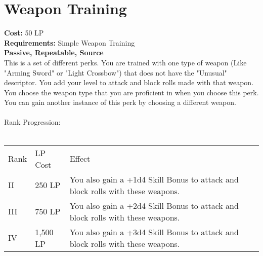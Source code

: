 \section{Weapon Training}\label{perk:weaponTraining}
\textbf{Cost:} 50 LP\\
\textbf{Requirements:} Simple Weapon Training\\
\textbf{Passive, Repeatable, Source}\\
This is a set of different perks.
You are trained with one type of weapon (Like "Arming Sword" or "Light Crossbow") that does not have the "Unusual" descriptor.
You add your level to attack and block rolls made with that weapon.\\
You choose the weapon type that you are proficient in when you choose this perk.
You can gain another instance of this perk by choosing a different weapon.\\
\\
Rank Progression:\\
\\
\begin{longtable}{l | l | p{9cm}}
	Rank & LP Cost & Effect\\
	II & 250 LP & You also gain a +1d4 Skill Bonus to attack and block rolls with these weapons.\\
	III & 750 LP & You also gain a +2d4 Skill Bonus to attack and block rolls with these weapons.\\
	IV & 1,500 LP & You also gain a +3d4 Skill Bonus to attack and block rolls with these weapons.\\
\end{longtable}